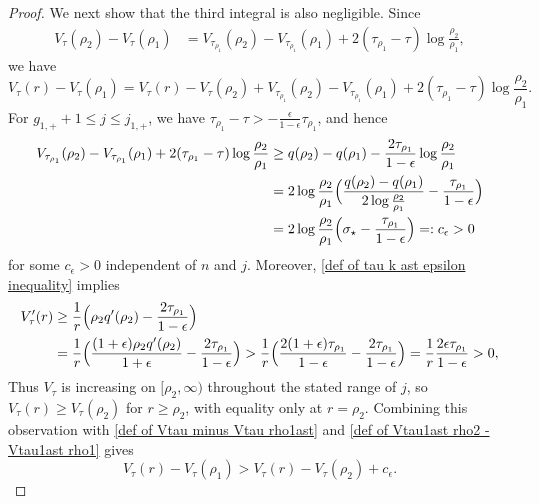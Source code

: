 \documentclass[a4paper]{article}
\numberwithin{equation}{section}
\begin{document}
\begin{proof}
We next show that the third integral is also negligible. Since
\begin{align*}
V_{\tau}(\rho_2)-V_{\tau}(\rho_1)
&=V_{\tau_{\rho_1}}(\rho_2)-V_{\tau_{\rho_1}}(\rho_1)+2(\tau_{\rho_1}-\tau)\log \frac{\rho_2}{\rho_1},
\end{align*}
we have 
\begin{equation}
\label{def of Vtau minus Vtau rho1ast}
V_{\tau}(r)-V_{\tau}(\rho_1) 
=
V_{\tau}(r)-V_{\tau}(\rho_2)
+
V_{\tau_{\rho_1}}(\rho_2)-V_{\tau_{\rho_1}}(\rho_1)+2(\tau_{\rho_1}-\tau)\log \frac{\rho_2}{\rho_1}.
\end{equation}
For $g_{1,+}+1\leq j\leq j_{1,+}$, we have $\tau_{\rho_1}-\tau>-\frac{\epsilon}{1-\epsilon}\tau_{\rho_1}$,
and hence
\begin{align}
    \begin{split}
\label{def of Vtau1ast rho2 - Vtau1ast rho1}
V_{\tau_{\rho_1}}(\rho_2)-V_{\tau_{\rho_1}}(\rho_1)+2(\tau_{\rho_1}-\tau)\log\frac{\rho_2}{\rho_1}
&\geq q(\rho_2)-q(\rho_1)-\frac{2\tau_{\rho_1}}{1-\epsilon}\log\frac{\rho_2}{\rho_1}
\\
&=
2\log\frac{\rho_2}{\rho_1}
\Bigl(\frac{q(\rho_2)-q(\rho_1)}{2\log\frac{\rho_2}{\rho_1}}-\frac{\tau_{\rho_1}}{1-\epsilon}\Bigr)
\\
&=2\log\frac{\rho_2}{\rho_1}
\Bigl(\sigma_{\star}-\frac{\tau_{\rho_1}}{1-\epsilon}\Bigr)
=:c_{\epsilon}>0
    \end{split}
\end{align}
for some $c_\epsilon>0$ independent of $n$ and $j$. Moreover, \eqref{def of tau k ast epsilon inequality} implies
\begin{align*}
 V_{\tau}'(r)&\geq \frac{1}{r}\Bigl(\rho_2q'(\rho_2)-\frac{2\tau_{\rho_1}}{1-\epsilon}\Bigr)
 \\
 &=
 \frac{1}{r}\Bigl(\frac{(1+\epsilon)\rho_2q'(\rho_2)}{1+\epsilon}-\frac{2\tau_{\rho_1}}{1-\epsilon}\Bigr)
 >\frac{1}{r}\Bigl(\frac{2(1+\epsilon)\tau_{\rho_1}}{1-\epsilon}-\frac{2\tau_{\rho_1}}{1-\epsilon}\Bigr)=\frac{1}{r}\frac{2\epsilon\tau_{\rho_1}}{1-\epsilon}>0,
\end{align*}
Thus $V_\tau$ is increasing on $[\rho_2,\infty)$ throughout the stated range of $j$, so $V_\tau(r)\geq V_\tau(\rho_2)$ for $r\geq\rho_2$, with equality only at $r=\rho_2$. Combining this observation with \eqref{def of Vtau minus Vtau rho1ast} and \eqref{def of Vtau1ast rho2 - Vtau1ast rho1} gives
\begin{equation}
\label{def of inequality Vtau r Vtau rho1ast}
    V_{\tau}(r)-V_{\tau}(\rho_1)>V_{\tau}(r)- V_{\tau}(\rho_2)+c_{\epsilon}.

\end{equation}
\end{proof}
\end{document}
